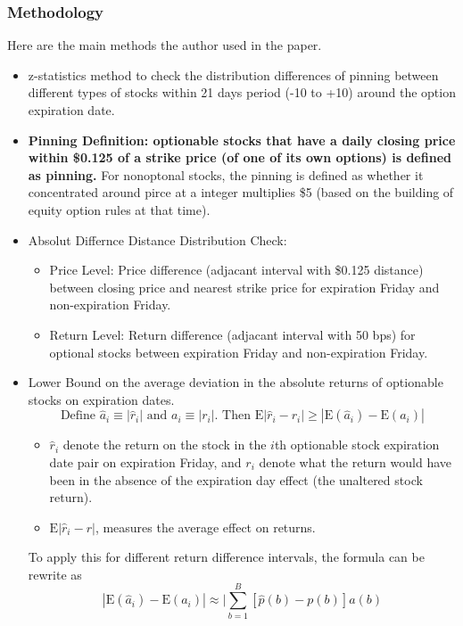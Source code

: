 \documentclass[10pt]{report}
\begin{document}
\subsubsection{Methodology}
Here are the main methods the author used in the paper.
\begin{itemize}
    \item z-statistics method to check the distribution differences of pinning between different types of stocks within 21 days period (-10 to +10) around the option expiration date.
    \item \textbf{Pinning Definition: optionable stocks that have a daily closing price within \$0.125 of a strike price (of one of its own options) is defined as pinning.} For nonoptonal stocks, the pinning is defined as whether it concentrated around pirce at a integer multiplies \$5 (based on the building of equity option rules at that time).
    \item Absolut Differnce Distance Distribution Check: 
    \begin{itemize}
        \item Price Level: Price difference (adjacant interval with \$0.125 distance) between closing price and nearest strike price for expiration Friday and non-expiration Friday. 
        \item Return Level: Return difference (adjacant interval with 50 bps) for optional stocks between expiration Friday and non-expiration Friday. 
    \end{itemize}
    \item Lower Bound on the average deviation in the absolute returns of optionable stocks on expiration dates.
    $$
\text {Define } \hat{a}_i \equiv\left|\hat{r}_i\right| \text { and } a_i \equiv\left|r_i\right| \text {. Then }
\mathrm{E}\left|\hat{r}_i-r_i\right| \geqslant\left|\mathrm{E}\left(\hat{a}_i\right)-\mathrm{E}\left(a_i\right)\right|
$$
\begin{itemize}
    \item $\hat{r}_i$ denote the return on the stock in the $i$th optionable stock expiration date pair on expiration Friday, and $r_i$ denote what the return would have been in the absence of the expiration day effect (the unaltered stock return). 
    \item $\mathrm{E}\left|\hat{r}_i-r\right|$, measures the average effect on returns.
\end{itemize}
To apply this for different return difference intervals, the formula can be rewrite as 
$$
\left|\mathrm{E}\left(\hat{a}_i\right)-\mathrm{E}\left(a_i\right)\right| \approx \mid \sum_{b=1}^B[\hat{p}(b)-p(b)] a(b)
$$
\end{itemize}
\end{document}
